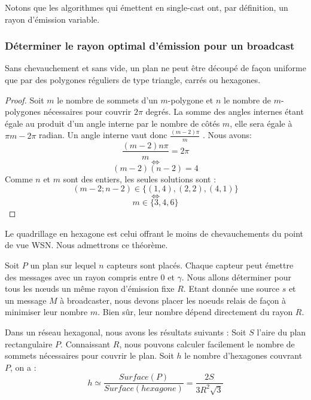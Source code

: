 Notons que les algorithmes qui émettent en single-cast ont, par définition, un rayon d'émission variable.

\subsubsection{Déterminer le rayon optimal d'émission pour un broadcast}
\begin{myth}
Sans chevauchement et sans vide, un plan ne peut être découpé de façon uniforme que par des polygones réguliers de type triangle, carrés ou hexagones.
\end{myth}
\begin{proof}
Soit $m$ le nombre de sommets d'un $m$-polygone et $n$ le nombre de $m$-polygones nécessaires pour couvrir $2\pi$ degrés. La somme des angles internes étant égale au produit d'un 
angle interne par le nombre de côtés $m$, elle sera égale à $\pi m-2 \pi$  radian. Un angle interne vaut donc $\frac{(m-2)\pi }{m}$ . Nous avons: 
$$\frac{(m-2)n\pi}{m}=2\pi$$
$$\Leftrightarrow$$
$$(m-2)(n-2)=4$$
Comme $n$ et $m$ sont des entiers, les seules solutions sont : 
$$(m-2;n-2)\in\{(1,4),(2,2),(4,1) \}$$
$$\Leftrightarrow$$
$$m \in \{ 3,4,6 \}$$
\end{proof}

\begin{myth}
Le quadrillage en hexagone est celui offrant le moins de chevauchements du point de vue WSN. Nous admettrons ce théorème.
\end{myth}


Soit $P$ un plan sur lequel $n$ capteurs sont placés. Chaque capteur peut émettre des messages avec un rayon compris entre 0 et $\gamma$. Nous allons déterminer pour tous les nœuds un même rayon d'émission fixe $R$.
Etant donnée une source $s$ et un message $M$ à broadcaster, nous devons placer les noeuds relais de façon à minimiser leur nombre $m$. Bien sûr, leur nombre dépend directement du rayon $R$.
 

Dans un réseau hexagonal, nous avons les résultats suivants :
Soit $S$ l'aire du plan rectangulaire $P$. Connaissant $R$, nous pouvons calculer facilement le nombre de sommets nécessaires pour couvrir le plan.
Soit $h$ le nombre d'hexagones couvrant $P$, on a : 
$$h \simeq \frac{Surface ( P)}{Surface(hexagone)}=\frac{2S}{3R^2 \sqrt{3}}$$

